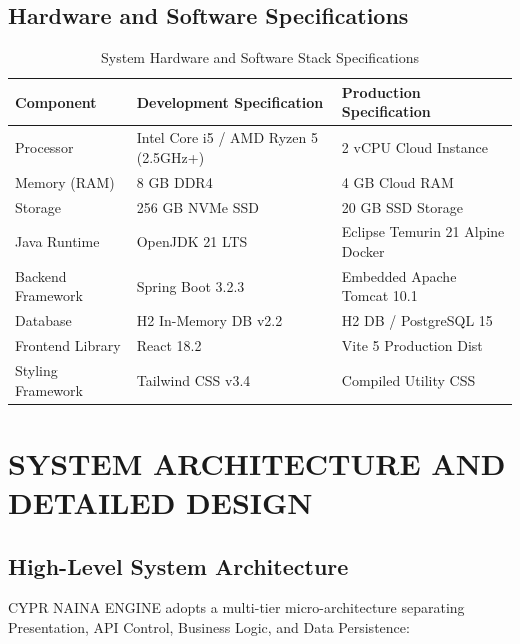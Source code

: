 \documentclass[12pt,a4paper,oneside]{report}
\begin{document}
\section{Hardware and Software Specifications}

\begin{table}[H]
\centering
\caption{System Hardware and Software Stack Specifications}
\begin{tabular}{@{}lll@{}}
\toprule
Component & Development Specification & Production Specification \\ \midrule
Processor & Intel Core i5 / AMD Ryzen 5 (2.5GHz+) & 2 vCPU Cloud Instance \\
Memory (RAM) & 8 GB DDR4 & 4 GB Cloud RAM \\
Storage & 256 GB NVMe SSD & 20 GB SSD Storage \\
Java Runtime & OpenJDK 21 LTS & Eclipse Temurin 21 Alpine Docker \\
Backend Framework & Spring Boot 3.2.3 & Embedded Apache Tomcat 10.1 \\
Database & H2 In-Memory DB v2.2 & H2 DB / PostgreSQL 15 \\
Frontend Library & React 18.2 & Vite 5 Production Dist \\
Styling Framework & Tailwind CSS v3.4 & Compiled Utility CSS \\
\bottomrule
\end{tabular}
\end{table}

\clearpage

\chapter{SYSTEM ARCHITECTURE AND DETAILED DESIGN}

\section{High-Level System Architecture}

CYPR NAINA ENGINE adopts a multi-tier micro-architecture separating Presentation, API Control, Business Logic, and Data Persistence:
\end{document}
